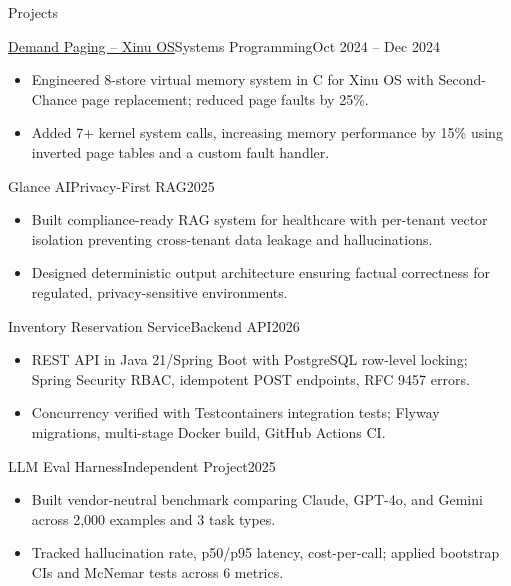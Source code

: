 \documentclass[]{mcdowellcv}
\begin{document}
\begin{cvsection}{Projects}
  \begin{cvsubsection}{\href{https://github.com/ncsu-csc-501/project3-mndedhia_akulka26_aapai}{Demand Paging -- Xinu OS}}{Systems Programming}{Oct 2024 -- Dec 2024}
    \begin{itemize}
      \item Engineered 8-store virtual memory system in C for Xinu OS with Second-Chance page replacement; reduced page faults by 25\%.
      \item Added 7+ kernel system calls, increasing memory performance by 15\% using inverted page tables and a custom fault handler.
    \end{itemize}
    \vspace{-1.5pt}
  \end{cvsubsection}

  \begin{cvsubsection}{Glance AI}{Privacy-First RAG}{2025}
    \begin{itemize}
      \item Built compliance-ready RAG system for healthcare with per-tenant vector isolation preventing cross-tenant data leakage and hallucinations.
      \item Designed deterministic output architecture ensuring factual correctness for regulated, privacy-sensitive environments.
    \end{itemize}
    \vspace{-1.5pt}
  \end{cvsubsection}

  \begin{cvsubsection}{Inventory Reservation Service}{Backend API}{2026}
    \begin{itemize}
      \item REST API in Java 21/Spring Boot with PostgreSQL row-level locking; Spring Security RBAC, idempotent POST endpoints, RFC 9457 errors.
      \item Concurrency verified with Testcontainers integration tests; Flyway migrations, multi-stage Docker build, GitHub Actions CI.
    \end{itemize}
    \vspace{-1.5pt}
  \end{cvsubsection}

  \begin{cvsubsection}{LLM Eval Harness}{Independent Project}{2025}
    \begin{itemize}
      \item Built vendor-neutral benchmark comparing Claude, GPT-4o, and Gemini across 2,000 examples and 3 task types.
      \item Tracked hallucination rate, p50/p95 latency, cost-per-call; applied bootstrap CIs and McNemar tests across 6 metrics.
    \end{itemize}
  \end{cvsubsection}
\end{cvsection}
\end{document}

